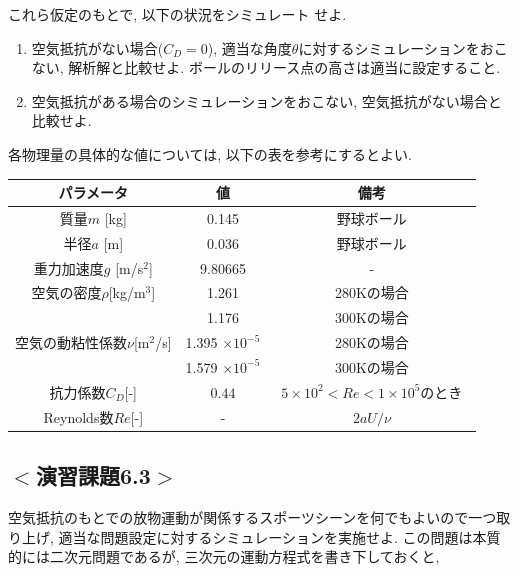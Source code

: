 これら仮定のもとで, 以下の状況をシミュレート	せよ. 
\begin{enumerate}
\item 空気抵抗がない場合($C_D=0$), 適当な角度$\theta$に対するシミュレーションをおこない, 解析解と比較せよ. 
ボールのリリース点の高さは適当に設定すること. 
\item 空気抵抗がある場合のシミュレーションをおこない, 空気抵抗がない場合と比較せよ.
\end{enumerate}


各物理量の具体的な値については, 以下の表を参考にするとよい.
\begin{table}[H]
\centering
\begin{tabular}{ccc}
\hline
パラメータ & 値 & 備考 \\
\hline
質量$m$ [kg] & 0.145 & 野球ボール \\ \hline
半径$a$ [m] & 0.036 &  野球ボール \\ \hline
重力加速度$g$ [m/s$^2$] & 9.80665 & - \\ \hline
空気の密度$\rho$[kg/m$^3$] & 1.261 & 280Kの場合 \\
 & 1.176 & 300Kの場合 \\ \hline
空気の動粘性係数$\nu$[m$^2$/s] & 1.395 $\times 10^{-5}$ & 280Kの場合 \\
 & 1.579 $\times 10^{-5}$ & 300Kの場合 \\ \hline
抗力係数$C_D$[-] & $0.44$ & $5 \times 10^2 < Re < 1 \times 10^5$のとき　\\ \hline
Reynolds数$Re$[-] & - & $2aU/\nu$ \\ \hline
\end{tabular}
\end{table}



\subsection*{$<$演習課題6.3$>$}
空気抵抗のもとでの放物運動が関係するスポーツシーンを何でもよいので一つ取り上げ, 適当な問題設定に対するシミュレーションを実施せよ. 
この問題は本質的には二次元問題であるが, 三次元の運動方程式を書き下しておくと, 

